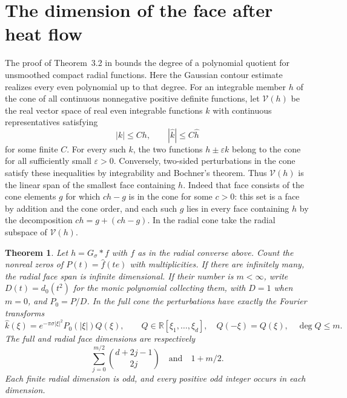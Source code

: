 \documentclass[11pt,a4paper]{article}
\newtheorem{theorem}{Theorem}[section]\newtheorem{lemma}[theorem]{Lemma}\newtheorem{proposition}[theorem]{Proposition}\newtheorem{corollary}[theorem]{Corollary}
\numberwithin{equation}{section}
\begin{document}
\section{The dimension of the face after heat flow}
\label{sec:faces}
The proof of Theorem~3.2 in \cite{JMR2009} bounds the degree of a polynomial quotient for unsmoothed compact radial functions. Here the Gaussian contour estimate realizes every even polynomial up to that degree. For an integrable member $h$ of the cone of all continuous nonnegative positive definite functions, let $\mathcal V(h)$ be the real vector space of real even integrable functions $k$ with continuous representatives satisfying
\[
 |k|\le C h,\qquad |\widehat k|\le C\widehat h
\]
for some finite $C$. For every such $k$, the two functions $h\pm\varepsilon k$ belong to the cone for all sufficiently small $\varepsilon>0$. Conversely, two-sided perturbations in the cone satisfy these inequalities by integrability and Bochner's theorem. Thus $\mathcal V(h)$ is the linear span of the smallest face containing $h$. Indeed that face consists of the cone elements $g$ for which $ch-g$ is in the cone for some $c>0$: this set is a face by addition and the cone order, and each such $g$ lies in every face containing $h$ by the decomposition $ch=g+(ch-g)$. In the radial cone take the radial subspace of $\mathcal V(h)$.

\begin{theorem}\label{thm:faces}
Let $h=G_\sigma*f$ with $f$ as in the radial converse above. Count the nonreal zeros of $P(t)=\widehat f(te)$ with multiplicities. If there are infinitely many, the radial face span is infinite dimensional. If their number is $m<\infty$, write $D(t)=d_0(t^2)$ for the monic polynomial collecting them, with $D=1$ when $m=0$, and $P_0=P/D$. In the full cone the perturbations have exactly the Fourier transforms
\[
 \widehat k(\xi)=e^{-\pi\sigma|\xi|^2} P_0(|\xi|) Q(\xi),
 \qquad Q\in\mathbb R[\xi_1,\ldots,\xi_d],\quad
 Q(-\xi)=Q(\xi),\quad \deg Q\le m.
\]
The full and radial face dimensions are respectively
\[
 \sum_{j=0}^{m/2}\binom{d+2j-1}{2j}
 \quad\text{and}\quad 1+m/2.
\]
Each finite radial dimension is odd, and every positive odd integer occurs in each dimension.
\end{theorem}
\end{document}
